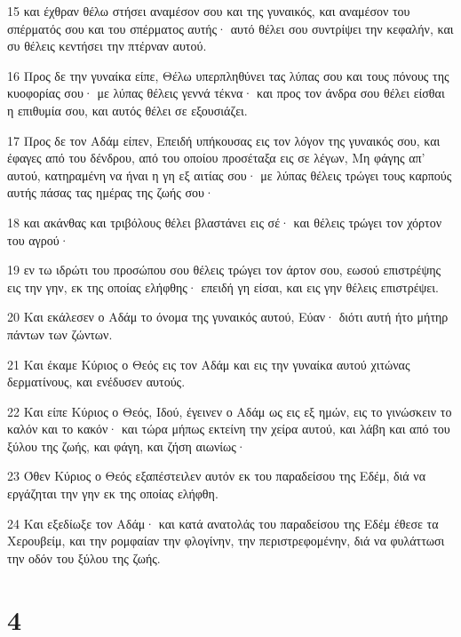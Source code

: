 \par 15 και έχθραν θέλω στήσει αναμέσον σου και της γυναικός, και αναμέσον του σπέρματός σου και του σπέρματος αυτής· αυτό θέλει σου συντρίψει την κεφαλήν, και συ θέλεις κεντήσει την πτέρναν αυτού.
\par 16 Προς δε την γυναίκα είπε, Θέλω υπερπληθύνει τας λύπας σου και τους πόνους της κυοφορίας σου· με λύπας θέλεις γεννά τέκνα· και προς τον άνδρα σου θέλει είσθαι η επιθυμία σου, και αυτός θέλει σε εξουσιάζει.
\par 17 Προς δε τον Αδάμ είπεν, Επειδή υπήκουσας εις τον λόγον της γυναικός σου, και έφαγες από του δένδρου, από του οποίου προσέταξα εις σε λέγων, Μη φάγης απ' αυτού, κατηραμένη να ήναι η γη εξ αιτίας σου· με λύπας θέλεις τρώγει τους καρπούς αυτής πάσας τας ημέρας της ζωής σου·
\par 18 και ακάνθας και τριβόλους θέλει βλαστάνει εις σέ· και θέλεις τρώγει τον χόρτον του αγρού·
\par 19 εν τω ιδρώτι του προσώπου σου θέλεις τρώγει τον άρτον σου, εωσού επιστρέψης εις την γην, εκ της οποίας ελήφθης· επειδή γη είσαι, και εις γην θέλεις επιστρέψει.
\par 20 Και εκάλεσεν ο Αδάμ το όνομα της γυναικός αυτού, Εύαν· διότι αυτή ήτο μήτηρ πάντων των ζώντων.
\par 21 Και έκαμε Κύριος ο Θεός εις τον Αδάμ και εις την γυναίκα αυτού χιτώνας δερματίνους, και ενέδυσεν αυτούς.
\par 22 Και είπε Κύριος ο Θεός, Ιδού, έγεινεν ο Αδάμ ως εις εξ ημών, εις το γινώσκειν το καλόν και το κακόν· και τώρα μήπως εκτείνη την χείρα αυτού, και λάβη και από του ξύλου της ζωής, και φάγη, και ζήση αιωνίως·
\par 23 Όθεν Κύριος ο Θεός εξαπέστειλεν αυτόν εκ του παραδείσου της Εδέμ, διά να εργάζηται την γην εκ της οποίας ελήφθη.
\par 24 Και εξεδίωξε τον Αδάμ· και κατά ανατολάς του παραδείσου της Εδέμ έθεσε τα Χερουβείμ, και την ρομφαίαν την φλογίνην, την περιστρεφομένην, διά να φυλάττωσι την οδόν του ξύλου της ζωής.

\chapter{4}

